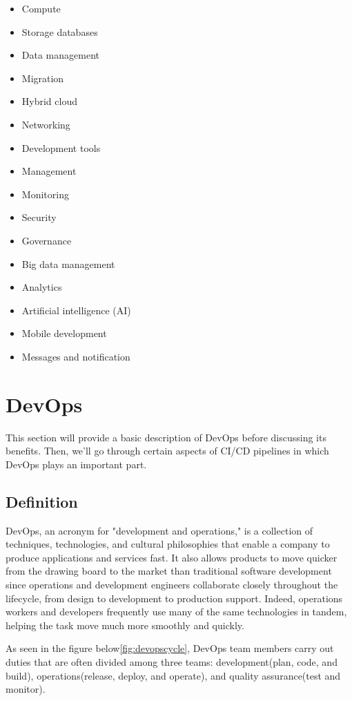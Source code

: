 \begin{multicols}{3}
    \begin{itemize}
\item Compute
\item Storage databases
\item Data management
\item Migration
\item Hybrid cloud
\item Networking
\item Development tools
\item Management
\item Monitoring
\item Security
\item Governance
\item Big data management
\item Analytics
\item Artificial intelligence (AI)
\item Mobile development
\item Messages and notification
    \end{itemize}
    \end{multicols}


\section{DevOps}
\qquad 

This section will provide a basic description of DevOps before discussing its benefits. Then, we'll go through certain aspects of CI/CD pipelines in which DevOps plays an important part. 

\subsection{Definition} 
\qquad

DevOps, an acronym for "development and operations," is a collection of techniques, technologies, and cultural philosophies that enable a company to produce applications and services fast. It also allows products to move quicker from the drawing board to the market than traditional software development since operations and development engineers collaborate closely throughout the lifecycle, from design to development to production support. Indeed, operations workers and developers frequently use many of the same technologies in tandem, helping the task move much more smoothly and quickly.

As seen in the figure below\ref{fig:devopscycle}, DevOps team members carry out duties that are often divided among three teams: development(plan, code, and build), operations(release, deploy, and operate), and quality assurance(test and monitor).

